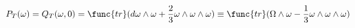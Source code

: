 \begin{equation}
P_{T}(\omega )=Q_{T}(\omega ,0)=\func{tr}(d\omega \wedge \omega +\frac{2}{3}%
\omega \wedge \omega \wedge \omega )\equiv \func{tr}(\Omega \wedge \omega -%
\frac{1}{3}\omega \wedge \omega \wedge \omega )  \label{eqn:CS3F}
\end{equation}

